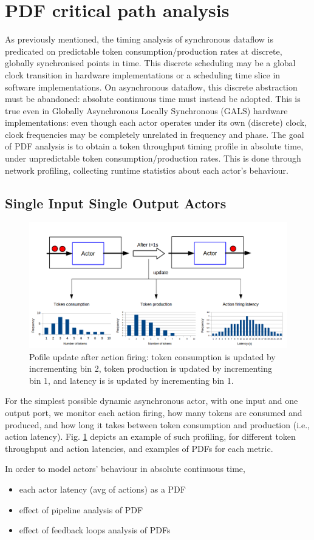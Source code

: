 \section{PDF critical path analysis}\label{sec:pdf}


As previously mentioned, the timing analysis of synchronous dataflow is predicated on predictable token consumption/production rates at discrete, globally synchronised points in time. This discrete scheduling may be a global clock transition in hardware implementations or a scheduling time slice in software implementations. On asynchronous dataflow, this discrete abstraction must be abandoned: absolute continuous time must instead be adopted. This is true even in Globally Asynchronous Locally Synchronous (GALS) hardware implementations: even though each actor operates under its own (discrete) clock, clock frequencies may be completely unrelated in frequency and phase. The goal of PDF analysis is to obtain a token throughput timing profile in absolute time, under unpredictable token consumption/production rates. This is done through network profiling, collecting runtime statistics about each actor's behaviour.

\subsection{Single Input Single Output Actors}

\begin{figure}[tb]
  \centering
  \includegraphics[width=1\columnwidth]{img/example1.png}
  \caption{Pofile update after action firing: token consumption is updated by incrementing bin 2, token production is updated by incrementing bin 1, and latency is is updated by incrementing bin 1.}
  \label{fig:example1}
\end{figure}




For the simplest possible dynamic asynchronous actor, with one input and one output port, we monitor each action firing, how many tokens are consumed and produced, and how long it takes between token consumption and production (i.e., action latency). Fig. \ref{fig:example1} depicts an example of such profiling, for different token throughput and action latencies, and examples of PDFs for each metric.



\par In order to model actors' behaviour in absolute continuous time, 

\begin{itemize}
\item each actor latency (avg of actions) as a PDF
\item effect of pipeline analysis of PDF
\item effect of feedback loops analysis of PDFs
\end{itemize}

